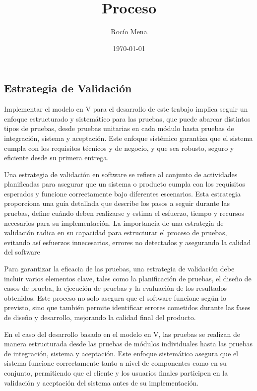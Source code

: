 \documentclass[main.tex]{subfiles}
\title{Proceso}
\author{Rocío Mena}
\date{\today}
\begin{document}
\maketitle

\subsection{Estrategia de Validación}

Implementar el modelo en V para el desarrollo de este trabajo implica seguir un enfoque estructurado y sistemático para las pruebas, que puede abarcar distintos tipos de pruebas, desde pruebas unitarias en cada módulo hasta pruebas de integración, sistema y aceptación. Este enfoque sistémico garantiza que el sistema cumpla con los requisitos técnicos y de negocio, y que sea robusto, seguro y eficiente desde su primera entrega.

Una estrategia de validación en software se refiere al conjunto de actividades planificadas para asegurar que un sistema o producto cumpla con los requisitos esperados y funcione correctamente bajo diferentes escenarios. Esta estrategia proporciona una guía detallada que describe los pasos a seguir durante las pruebas, define cuándo deben realizarse y estima el esfuerzo, tiempo y recursos necesarios para su implementación. La importancia de una estrategia de validación radica en su capacidad para estructurar el proceso de pruebas, evitando así esfuerzos innecesarios, errores no detectados y asegurando la calidad del software \cite{pressman2010ingeneria}

Para garantizar la eficacia de las pruebas, una estrategia de validación debe incluir varios elementos clave, tales como la planificación de pruebas, el diseño de casos de prueba, la ejecución de pruebas y la evaluación de los resultados obtenidos. Este proceso no solo asegura que el software funcione según lo previsto, sino que también permite identificar errores cometidos durante las fases de diseño y desarrollo, mejorando la calidad final del producto.

En el caso del desarrollo basado en el modelo en V, las pruebas se realizan de manera estructurada desde las pruebas de módulos individuales hasta las pruebas de integración, sistema y aceptación. Este enfoque sistemático asegura que el sistema funcione correctamente tanto a nivel de componentes como en su conjunto, permitiendo que el cliente y los usuarios finales participen en la validación y aceptación del sistema antes de su implementación.
\end{document}
